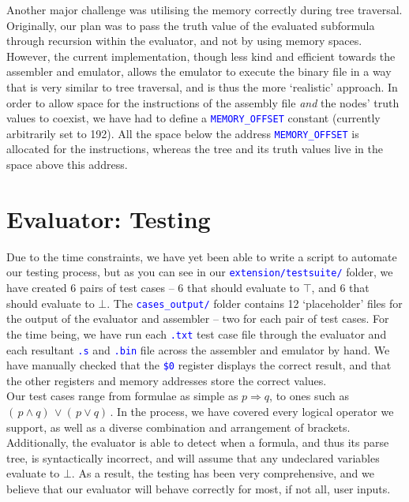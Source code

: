 \documentclass[11pt]{article}
\newcommand{\code}[1]{\mbox{\texttt{\textcolor{blue}{#1}}}}
\begin{document}
Another major challenge was utilising the memory correctly during tree traversal. Originally, our plan was to pass the truth value of the evaluated subformula through recursion within the evaluator, and not by using memory spaces. However, the current implementation, though less kind and efficient towards the assembler and emulator, allows the emulator to execute the binary file in a way that is very similar to tree traversal, and is thus the more `realistic' approach. In order to allow space for the instructions of the assembly file \textit{and} the nodes' truth values to coexist, we have had to define a \code{MEMORY\_OFFSET} constant (currently arbitrarily set to 192). All the space below the address \code{MEMORY\_OFFSET} is allocated for the instructions, whereas the tree and its truth values live in the space above this address.

\section{Evaluator: Testing}

Due to the time constraints, we have yet been able to write a script to automate our testing process, but as you can see in our \code{extension/testsuite/} folder, we have created 6 pairs of test cases – 6 that should evaluate to \(\top\), and 6 that should evaluate to \(\bot\). The \code{cases\_output/} folder contains 12 `placeholder' files for the output of the evaluator and assembler – two for each pair of test cases. For the time being, we have run each \code{.txt} test case file through the evaluator and each resultant \code{.s} and \code{.bin} file across the assembler and emulator by hand. We have manually checked that the \code{\$0} register displays the correct result, and that the other registers and memory addresses store the correct values.\\

Our test cases range from formulae as simple as \(p \Rightarrow q\), to ones such as \(( \,p \land q) \, \lor ( \,p \lor q) \,\). In the process, we have covered every logical operator we support, as well as a diverse combination and arrangement of brackets. Additionally, the evaluator is able to detect when a formula, and thus its parse tree, is syntactically incorrect, and will assume that any undeclared variables evaluate to \(\bot\). As a result, the testing has been very comprehensive, and we believe that our evaluator will behave correctly for most, if not all, user inputs.
\end{document}
